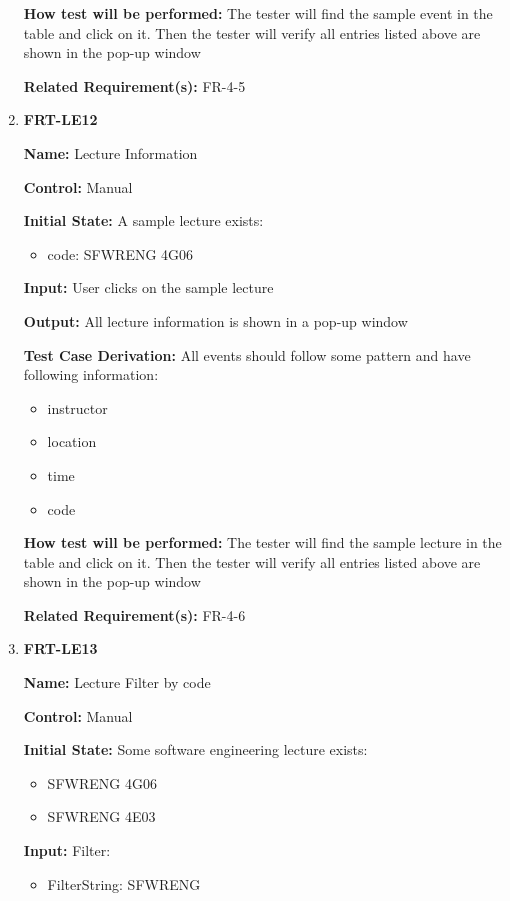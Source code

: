 \documentclass[12pt, titlepage]{article}
\begin{document}
\begin{enumerate}
\textbf{How test will be performed:} The tester will find the sample event in the table and click on it. Then the tester will verify all entries listed above are shown in the pop-up window

\textbf{Related Requirement(s):} FR-4-5

\item{\textbf{FRT-LE12}}

\textbf{Name:} Lecture Information

\textbf{Control:} Manual
					
\textbf{Initial State:} A sample lecture exists:
\begin{itemize}
\item code: SFWRENG 4G06
\end{itemize}

\textbf{Input:} User clicks on the sample lecture
					
\textbf{Output:} All lecture information is shown in a pop-up window

\textbf{Test Case Derivation:} All events should follow some pattern and have following information:
\begin{itemize}
\item instructor
\item location
\item time
\item code
\end{itemize}
					
\textbf{How test will be performed:} The tester will find the sample lecture in the table and click on it. Then the tester will verify all entries listed above are shown in the pop-up window

\textbf{Related Requirement(s):} FR-4-6

\item{\textbf{FRT-LE13}}

\textbf{Name:} Lecture Filter by code

\textbf{Control:} Manual
					
\textbf{Initial State:} Some software engineering lecture exists:
\begin{itemize}
\item SFWRENG 4G06
\item SFWRENG 4E03
\end{itemize}

\textbf{Input:} Filter:
\begin{itemize}
\item FilterString: SFWRENG
\end{itemize}
					

\end{enumerate}
\end{document}
